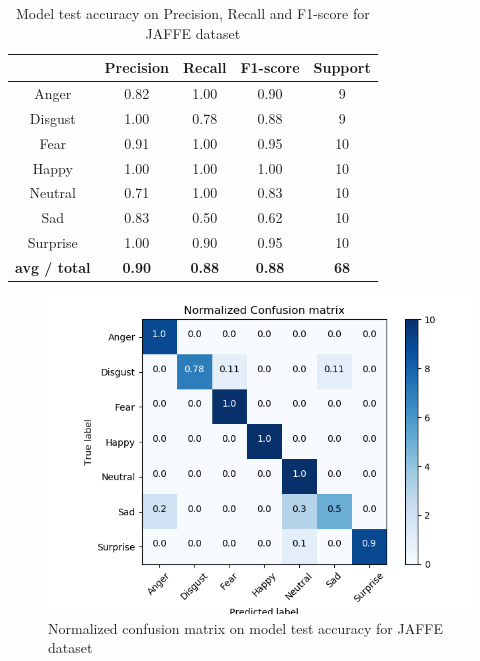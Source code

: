 \documentclass[master]{thesis-uestc}
\begin{document}
\begin{table}[ht]
\renewcommand{\arraystretch}{1.3}
\caption{Model test accuracy on Precision, Recall and F1-score for JAFFE dataset}
\label{table_jaffe_scores}
\begin{center}
\begin{tabular}{|c|c|c|c|c|}

\hline
 & Precision & Recall & F1-score & Support\\ \hline

Anger & 0.82 & 1.00 & 0.90 & 9\\ \hline
Disgust & 1.00 & 0.78 & 0.88 & 9\\ \hline
Fear & 0.91 & 1.00 & 0.95 & 10\\ \hline
Happy & 1.00 & 1.00 & 1.00 & 10\\ \hline
Neutral & 0.71 & 1.00 & 0.83 & 10\\ \hline
Sad & 0.83 & 0.50 & 0.62 & 10\\ \hline
Surprise & 1.00 & 0.90 & 0.95 & 10\\ \hline

\textbf{avg / total} & \textbf{0.90} & \textbf{0.88} & \textbf{0.88} & \textbf{68}\\ \hline
\end{tabular}
\end{center}
\end{table}

\begin{figure}[ht]
\includegraphics[width=5in]{pic/JAFFE_CM_normalized.png}
\caption{Normalized confusion matrix on model test accuracy for JAFFE dataset}
\label{fig_jaffe_cm_scores}
\end{figure}
\end{document}
